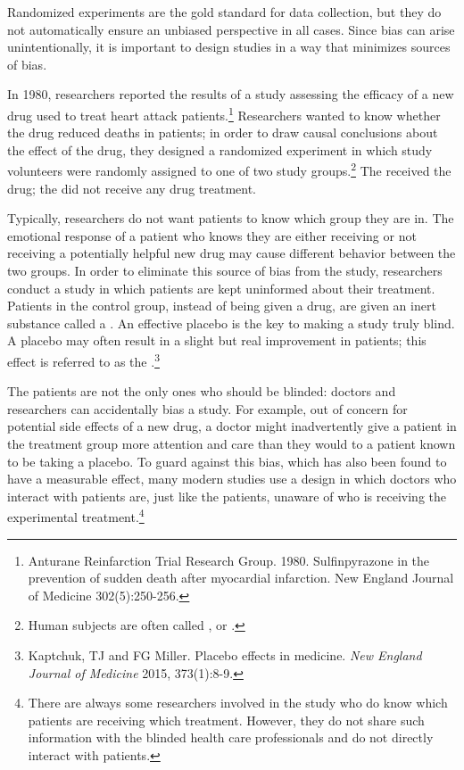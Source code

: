 Randomized experiments are the gold standard for data collection, but they do not automatically ensure an unbiased perspective in all cases. Since bias can arise unintentionally, it is important to design studies in a way that minimizes sources of bias.

In 1980, researchers reported the results of a study assessing the efficacy of a new drug used to treat heart attack patients.\footnote{Anturane Reinfarction Trial Research Group. 1980. Sulfinpyrazone in the prevention of sudden death after myocardial infarction. New England Journal of Medicine 302(5):250-256.} Researchers wanted to know whether the drug reduced deaths in patients; in order to draw causal conclusions about the effect of the drug, they designed a randomized experiment in which study volunteers were randomly assigned to one of two study groups.\footnote{Human subjects are often called , or .} The  received the drug; the  did not receive any drug treatment.

Typically, researchers do not want patients to know which group they are in. The emotional response of a patient who knows they are either receiving or not receiving a potentially helpful new drug may cause different behavior between the two groups. In order to eliminate this source of bias from the study, researchers conduct a  study in which patients are kept uninformed about their treatment. Patients in the control group, instead of being given a drug, are given an inert substance called a . An effective placebo is the key to making a study truly blind. A placebo may often result in a slight but real improvement in patients; this effect is referred to as the .\footnote{Kaptchuk, TJ and FG Miller. Placebo effects in medicine. \textit{New England Journal of Medicine} 2015, 373(1):8-9.}

The patients are not the only ones who should be blinded: doctors and researchers can accidentally bias a study. For example, out of concern for potential side effects of a new drug, a doctor might inadvertently give a patient in the treatment group more attention and care than they would to a patient known to be taking a placebo. To guard against this bias, which has also been found to have a measurable effect, many modern studies use a  design in which doctors who interact with patients are, just like the patients, unaware of who is receiving the experimental treatment.\footnote{There are always some researchers involved in the study who do know which patients are receiving which treatment. However, they do not share such information with the blinded health care professionals and do not directly interact with patients.}

